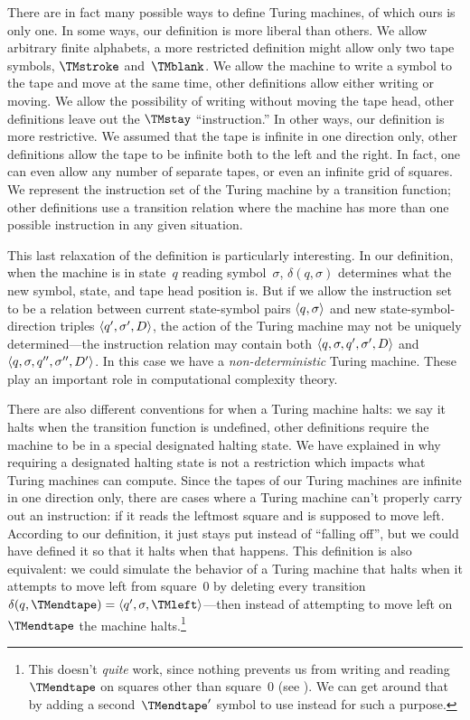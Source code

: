 \documentclass[../../../include/open-logic-section]{subfiles}
\begin{document}

There are in fact many possible ways to define Turing machines, of
which ours is only one.  In some ways, our definition is more liberal
than others. We allow arbitrary finite alphabets, a more restricted
definition might allow only two tape symbols, $\TMstroke$
and~$\TMblank$.  We allow the machine to write a symbol to the tape
and move at the same time, other definitions allow either writing or
moving.  We allow the possibility of writing without moving the tape
head, other definitions leave out the $\TMstay$ ``instruction.''  In
other ways, our definition is more restrictive. We assumed that the
tape is infinite in one direction only, other definitions allow the
tape to be infinite both to the left and the right. In fact, one can
even allow any number of separate tapes, or even an infinite grid of
squares.  We represent the instruction set of the Turing machine by a
transition function; other definitions use a transition relation where
the machine has more than one possible instruction in any given
situation.

This last relaxation of the definition is particularly interesting.
In our definition, when the machine is in state~$q$ reading
symbol~$\sigma$, $\delta(q, \sigma)$ determines what the new symbol,
state, and tape head position is.  But if we allow the instruction set
to be a relation between current state-symbol pairs $\langle q,
  \sigma \rangle$ and new state-symbol-direction triples $\langle q', \sigma',
  D \rangle$, the action of the Turing machine may not be uniquely
determined---the instruction relation may contain both $\langle q,
  \sigma, q', \sigma', D \rangle$ and $\langle q, \sigma, q'', \sigma'', D' \rangle$.
In this case we have a \emph{non-deterministic} Turing machine.  These
play an important role in computational complexity theory.

There are also different conventions for when a Turing machine halts:
we say it halts when the transition function is undefined, other
definitions require the machine to be in a special designated halting
state. We have explained in  why requiring a
designated halting state is not a restriction which impacts what
Turing machines can compute.  Since the tapes of our Turing machines
are infinite in one direction only, there are cases where a Turing
machine can't properly carry out an instruction: if it reads the
leftmost square and is supposed to move left. According to our
definition, it just stays put instead of ``falling off'', but we could
have defined it so that it halts when that happens. This definition is
also equivalent: we could simulate the behavior of a Turing machine
that halts when it attempts to move left from square~$0$ by deleting
every transition $\delta(q,\TMendtape) =
\tuple{q',\sigma,\TMleft}$---then instead of attempting to move left
on~$\TMendtape$ the machine halts.\footnote{This doesn't \emph{quite}
work, since nothing prevents us from writing and reading $\TMendtape$
on squares other than square~$0$ (see ). We can
get around that by adding a second~$\TMendtape'$ symbol to use instead
for such a purpose.}
\end{document}
